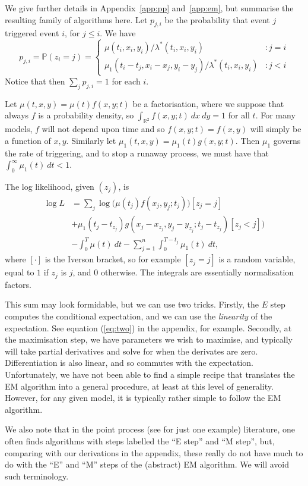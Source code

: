 \documentclass[twoside,a4paper]{article}
\theoremstyle{plain}
\theoremstyle{definition}
\begin{document}
We give further details in Appendix~\ref{app:pp} and~\ref{app:em}, but summarise the
resulting family of algorithms here.  Let $p_{j,i}$ be the probability that event $j$
triggered event $i$, for $j\leq i$.  We have
\[
p_{j,i} = \mathbb P(z_i=j) = \begin{cases}
\mu(t_i,x_i,y_i) / \lambda^*(t_i,x_i,y_i) &: j=i \\
\mu_1(t_i-t_j, x_i-x_j, y_i-y_j) / \lambda^*(t_i,x_i,y_i) &: j<i
\end{cases}
\]
Notice that then $\sum_j p_{j,i} = 1$ for each $i$.

Let $\mu(t,x,y) = \mu(t) f(x,y;t)$ be a factorisation, where we suppose that always
$f$ is a probability density, so $\int_{\mathbb R^2} f(x,y;t) \ dx \ dy = 1$ for all $t$.
For many models, $f$ will not depend upon time and so $f(x,y;t) = f(x,y)$ will simply be
a function of $x,y$.  Similarly let $\mu_1(t,x,y) = \mu_1(t) g(x,y;t)$.  Then $\mu_1$
governs the rate of triggering, and to stop a runaway process, we must have that
$\int_0^\infty \mu_1(t) \ dt < 1$.

The log likelihood, given $(z_j)$, is
\begin{align*}
\log L &= \sum_j \log\Big(\mu(t_j) f(x_j,y_j;t_j)) [z_j=j] \\
&+ \mu_1(t_j - t_{z_j}) g(x_j - x_{z_j}, y_j - y_{z_j};t_j - t_{z_j}) [z_j<j] \Big) \\
&- \int_0^T \mu(t) \ dt - \sum_{j=1}^n \int_0^{T-t_j} \mu_1(t) \ dt,
\end{align*}
where $[\cdot]$ is the Iverson bracket, so for example $[z_j=j]$ is a random variable,
equal to $1$ if $z_j$ is $j$, and $0$ otherwise.  The integrals are essentially
normalisation factors.

This sum may look formidable, but we can use two tricks.  Firstly, the $E$ step
computes the conditional expectation, and we can use the \emph{linearity} of
the expectation.  See equation (\ref{eq:two}) in the appendix, for example.
Secondly, at the maximisation step, we have parameters we wish to maximise, and typically
will take partial derivatives and solve for when the derivates are zero.  Differentiation
is also linear, and so commutes with the expectation.  Unfortunately, we have not been
able to find a simple recipe that translates the EM algorithm into a general procedure,
at least at this level of generality.  However, for any given model, it is typically
rather simple to follow the EM algorithm.

We also note that in the point process (see \cite[page~1402]{sepp2} for just one example)
literature, one often finds algorithms with steps labelled the ``E step'' and ``M step'',
but, comparing with our derivations in the appendix, these really do not have much to do
with the ``E'' and ``M'' steps of the (abstract) EM algorithm.  We will avoid such terminology.
\end{document}
